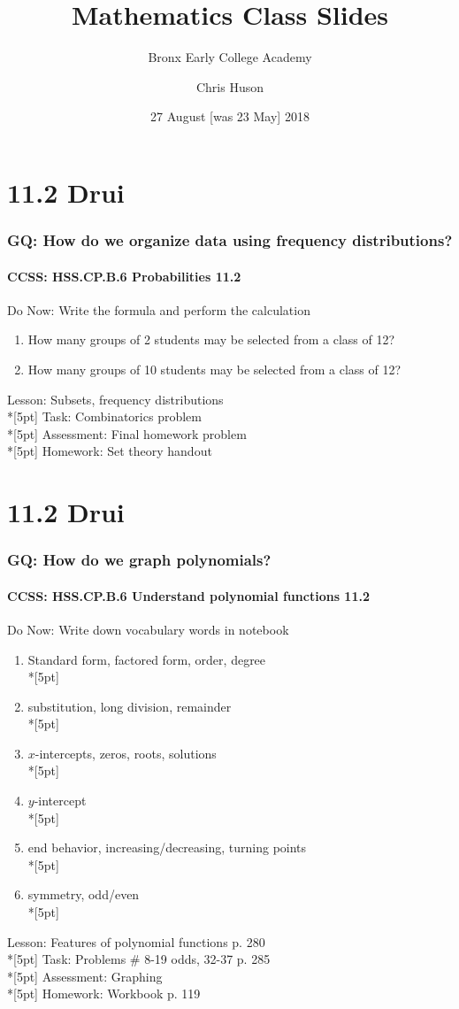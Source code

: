 \documentclass{beamer}
\title{Mathematics Class Slides}
\subtitle{Bronx Early College Academy}
\author{Chris Huson}
\date{27 August [was 23 May] 2018}
\begin{document}
\frame{\titlepage}



\section{11.2 Drui}
\frame
{
  \frametitle{GQ: How do we organize data using frequency distributions?}
  \framesubtitle{CCSS: HSS.CP.B.6 Probabilities \qquad \qquad \qquad \alert{11.2}}

  \begin{block}{Do Now: Write the formula and perform the calculation}
  \begin{enumerate}
      \item How many groups of 2 students may be selected from a class of 12?
      \item How many groups of 10 students may be selected from a class of 12?
  \end{enumerate}
  \end{block}
  Lesson: Subsets, frequency distributions\\*[5pt]
  Task: Combinatorics problem\\*[5pt]
  Assessment: Final homework problem\\*[5pt]
  Homework: Set theory handout
}

\section{11.2 Drui}
\frame
{
  \frametitle{GQ: How do we graph polynomials?}
  \framesubtitle{CCSS: HSS.CP.B.6 Understand polynomial functions \qquad \qquad \qquad \alert{11.2}}

  \begin{block}{Do Now: Write down vocabulary words in notebook}
  \begin{enumerate}
    \item Standard form, factored form, order, degree\\*[5pt]
    \item substitution, long division, remainder\\*[5pt]
    \item $x$-intercepts, zeros, roots, solutions\\*[5pt]
    \item $y$-intercept\\*[5pt]
    \item end behavior, increasing/decreasing, turning points\\*[5pt]
    \item symmetry, odd/even\\*[5pt]
  \end{enumerate}
  \end{block}
  Lesson: Features of polynomial functions p. 280\\*[5pt]
  Task: Problems \# 8-19 odds, 32-37 p. 285\\*[5pt]
  Assessment: Graphing\\*[5pt]
  Homework: Workbook p. 119
}
\end{document}
